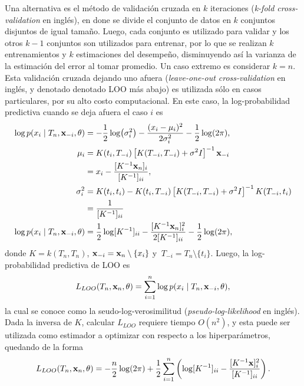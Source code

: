 Una alternativa es el método de validación cruzada en \(k\) iteraciones (\emph{k-fold cross-validation} en inglés), en done se divide el conjunto de datos en \(k\) conjuntos disjuntos de igual tamaño. Luego, cada conjunto es utilizado para validar y los otros \(k-1\) conjuntos son utilizados para entrenar, por lo que se realizan \(k\) entrenamientos y \(k\) estimaciones del desempeño, disminuyendo así la varianza de la estimación del error al tomar promedio. Un caso extremo es considerar \(k=n\). Esta validación cruzada dejando uno afuera (\emph{leave-one-out cross-validation} en inglés, y denotado denotado LOO más abajo) es utilizada sólo en casos particulares, por su alto costo computacional. En este caso, la log-probabilidad predictiva cuando se deja afuera el caso \(i\) es
\begin{align*}
	\log p(x_i \mid T_n, \mathbf{x}_{-i}, \theta)	&= -\frac{1}{2} \log (\sigma_i^2) - \frac{(x_i - \mu_i)^2}{2\sigma_i^2} - \frac{1}{2} \log(2\pi), \\
	\mu_i										&= K(t_i, T_{-i}) \left[K(T_{-i}, T_{-i}) + \sigma^2 I\right]^{-1} \mathbf{x}_{-i} \\
												&= x_i - \frac{[K^{-1} \mathbf{x}_n]_i}{[K^{-1}]_{ii}},\\
	\sigma_i^2								&= K(t_i, t_i) - K(t_i, T_{-i}) \left[K(T_{-i}, T_{-i}) + \sigma^2 I\right]^{-1} K(T_{-i}, t_i) \\
												&= \frac{1}{[K^{-1}]_{ii}} \\
	\log p(x_i \mid T_n, \mathbf{x}_{-i}, \theta)	&= \frac{1}{2}\log [K^{-1}]_{ii} - \frac{[K^{-1} \mathbf{x}_n]_i^2}{2 [K^{-1}]_{ii}} - \frac{1}{2} \log(2\pi),
\end{align*}
donde \(K = k(T_n, T_n)\), \(\mathbf{x}_{-i} = \mathbf{x}_n \setminus \{x_i\}\) y \(~T_{-i} = T_n \setminus \{t_i\}\). Luego, la log-probabilidad predictiva de LOO es
\begin{equation*}
	L_{LOO}(T_n, \mathbf{x}_n, \theta) = \sum_{i=1}^{n} \log p(x_i \mid T_n, \mathbf{x}_{-i}, \theta),
\end{equation*}
la cual se conoce como la seudo-log-verosimilitud (\emph{pseudo-log-likelihood} en inglés). Dada la inversa de \(K\), calcular \(L_{LOO}\) requiere tiempo \(O(n^2)\), y esta puede ser utilizada como estimador a optimizar con respecto a los hiperparámetros, quedando de la forma
\begin{equation*}
	L_{LOO}(T_n, \mathbf{x}_n, \theta) = -\frac{n}{2}\log(2\pi) + \frac{1}{2} \sum_{i=1}^{n} \left(\log [K^{-1}]_{ii} - \frac{[K^{-1} \mathbf{x}]_i^2}{[K^{-1}]_{ii}}\right).
\end{equation*}

